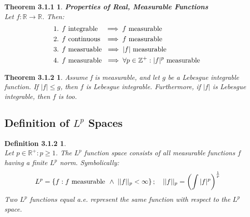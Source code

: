 \documentclass{article}
\theoremstyle{plain}
\newtheorem*{def312*}{Definition 3.1.2}
\newtheorem*{theorem311*}{Theorem 3.1.1}
\newtheorem*{theorem312*}{Theorem 3.1.2}
\begin{document}
\begin{theorem311*} \textbf{Properties of Real, Measurable Functions} \\
Let $ f : \mathbb{R} \to \mathbb{R} $. Then:
\begin{align*}
& \text{\rm{1. }} f \text{\rm{ integrable }} \hspace{.52 em} \implies f \text{\rm{ measurable }} \\
& \text{\rm{2. }} f \text{\rm{ continuous }} \hspace{.18 em} \implies f \text{\rm{ measurable }} \\
& \text{\rm{3. }} f \text{\rm{ measruable }} \implies |f| \text{\rm{ measurable }} \\
& \text{\rm{4. }} f \text{\rm{ measurable }} \implies \forall p \in \mathbb{Z^{+}} : |f|^{p} \text{\rm{ measurable }}
\end{align*}
\end{theorem311*}

\begin{theorem312*} Assume f is measurable, and let $ g $ be a Lebesgue integrable function. If $ |f| \leq g $, then $ f $ is Lebesgue integrable. Furthermore, if $ | f | $ is Lebesgue integrable, then $ f $ is too.
\end{theorem312*}

\subsection*{Definition of $L^{p}$ Spaces}


\begin{def312*}  \\
Let $ p \in \mathbb{R^{+}} : p \geq 1 $. The $ L^{p} $ function space consists of all measurable functions $ f $ having a finite $ L^{p} $ norm. Symbolically:
$$
L^{p} = \left\{ f: f \text{\rm{ measurable }} \hspace{.1 em} \land \hspace{.30 em}  || f ||_{p} < \infty \right\} ; \quad || f ||_{p} = \left(\int |f|^{p}\right)^{\frac{1}{p}}
$$
Two $ L^{p} $ functions equal a.e. represent the same function with respect to the $ L^{p} $ space.
\end{def312*}
\end{document}
